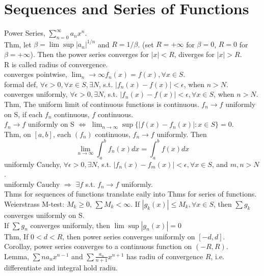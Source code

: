 \documentclass[paper=a4, fontsize=11pt]{scrartcl} %
\numberwithin{equation}{section} %
\numberwithin{figure}{section} %
\numberwithin{table}{section} %
\begin{document}
\section{Sequences and Series of Functions}
Power Series, $\sum_{n=0}^\infty a_n x^n$.\\
Thm, let $\beta= \lim\sup |a_n|^{1/n}$ and $R=1/\beta$. (set $R=+\infty$ for $\beta=0$, $R=0$ for $\beta=+\infty$). Then the power series converges for $|x|<R$, diverges for $|x|>R$.\\
R is called radius of convergence.\\
converges pointwise, $\lim_{n}\rightarrow\infty f_n(x)=f(x), \forall x\in S$.\\
formal def, $\forall \epsilon>0, \forall x\in S, \exists N$, s.t. $|f_n(x)-f(x)|<\epsilon$, when $n>N$.\\
converges uniformly, $\forall \epsilon>0, \exists N$, s.t. $|f_n(x)-f(x)|<\epsilon, \forall x\in S$, when $n>N$.\\
Thm, The uniform limit of continuous functions is continuous. $f_n\rightarrow f$ uniformly on S, if each $f_n$ continuous, $f$ continuous.\\
$f_n\rightarrow f$ uniformly on S  $\Leftrightarrow$ $\lim_{n\rightarrow\infty} \sup\{|f(x)-f_n(x)|:x\in S\} = 0$.\\
Thm, on $[a,b]$, each $(f_n)$ continuous, $f_n\rightarrow f$ uniformly. Then
\begin{equation}
\lim_{n\rightarrow \infty}\int_a^b f_n(x) dx = \int_a^b f(x) dx
\end{equation}
uniformly Cauchy, $\forall\epsilon>0, \exists N$, s.t. $|f_n(x)-f_m(x)|<\epsilon, \forall x\in S$, and $m,n>N$.\\
uniformly Cauchy $\Rightarrow$ $\exists f$ s.t. $f_n\rightarrow f$ uniformly.\\
Thms for sequences of functions translate eaily into Thms for series of functions.\\
Weierstrass M-test: $M_k\geq 0$, $\sum M_k<\infty$. If $|g_k(x)|\leq M_k,\forall x\in S$, then $\sum g_k$ converges uniformly on S.\\
If $\sum g_n$ converges uniformly, then $\lim\sup|g_n(x)| = 0$\\
Thm, If $0<d<R$, then power series converges uniformly on $[-d,d]$.\\
Corollay, power series converges to a continuous function on $(-R, R)$.\\
Lemma, $\sum na_nx^{n-1}$ and $\sum \frac{a_n}{n+1} x^{n+1}$ has radiu of convergence $R$, i.e. differentiate and integral hold radiu.\\
\end{document}
